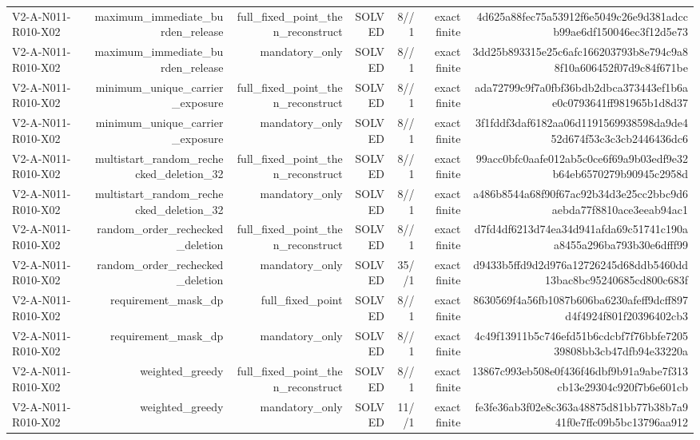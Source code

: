 {\begin{longtable}{lrrrrrr}
V2-A-N011-R010-X02 & maximum\_immediate\_burden\_release & full\_fixed\_point\_then\_reconstruct & SOLVED & 8//1 & exact finite & 4d625a88fec75a53912f6e5049c26e9d381adccb99ae6df150046ec3f12d5e73 \\
V2-A-N011-R010-X02 & maximum\_immediate\_burden\_release & mandatory\_only & SOLVED & 8//1 & exact finite & 3dd25b893315e25c6afc166203793b8e794c9a88f10a606452f07d9c84f671be \\
V2-A-N011-R010-X02 & minimum\_unique\_carrier\_exposure & full\_fixed\_point\_then\_reconstruct & SOLVED & 8//1 & exact finite & ada72799c9f7a0fbf36bdb2dbca373443ef1b6ae0c0793641ff981965b1d8d37 \\
V2-A-N011-R010-X02 & minimum\_unique\_carrier\_exposure & mandatory\_only & SOLVED & 8//1 & exact finite & 3f1fddf3daf6182aa06d1191569938598da9de452d674f53c3c3cb2446436dc6 \\
V2-A-N011-R010-X02 & multistart\_random\_rechecked\_deletion\_32 & full\_fixed\_point\_then\_reconstruct & SOLVED & 8//1 & exact finite & 99acc0bfc0aafe012ab5c0ce6f69a9b03edf9e32b64eb6570279b90945c2958d \\
V2-A-N011-R010-X02 & multistart\_random\_rechecked\_deletion\_32 & mandatory\_only & SOLVED & 8//1 & exact finite & a486b8544a68f90f67ac92b34d3e25cc2bbc9d6aebda77f8810ace3eeab94ac1 \\
V2-A-N011-R010-X02 & random\_order\_rechecked\_deletion & full\_fixed\_point\_then\_reconstruct & SOLVED & 8//1 & exact finite & d7fd4df6213d74ea34d941afda69c51741c190aa8455a296ba793b30e6dfff99 \\
V2-A-N011-R010-X02 & random\_order\_rechecked\_deletion & mandatory\_only & SOLVED & 35//1 & exact finite & d9433b5ffd9d2d976a12726245d68ddb5460dd13bac8bc95240685cd800c683f \\
V2-A-N011-R010-X02 & requirement\_mask\_dp & full\_fixed\_point & SOLVED & 8//1 & exact finite & 8630569f4a56fb1087b606ba6230afeff9dcff897d4f4924f801f20396402cb3 \\
V2-A-N011-R010-X02 & requirement\_mask\_dp & mandatory\_only & SOLVED & 8//1 & exact finite & 4c49f13911b5c746efd51b6cdcbf7f76bbfe720539808bb3cb47dfb94e33220a \\
V2-A-N011-R010-X02 & weighted\_greedy & full\_fixed\_point\_then\_reconstruct & SOLVED & 8//1 & exact finite & 13867c993eb508e0f436f46dbf9b91a9abe7f313cb13e29304c920f7b6e601cb \\
V2-A-N011-R010-X02 & weighted\_greedy & mandatory\_only & SOLVED & 11//1 & exact finite & fe3fe36ab3f02e8c363a48875d81bb77b38b7a941f0e7ffc09b5bc13796aa912 \\

\end{longtable}}
